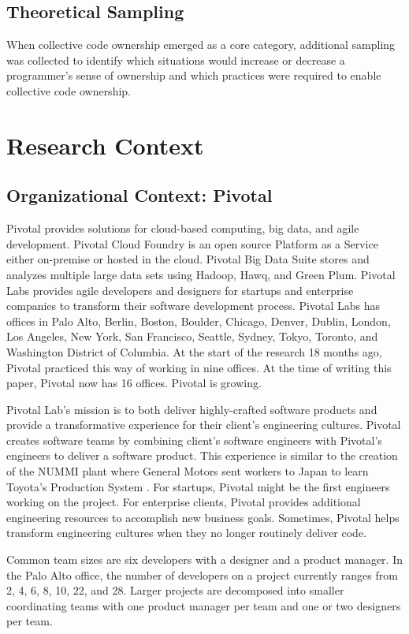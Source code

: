 \subsection{Theoretical Sampling}
When collective code ownership emerged as a core category, additional sampling was collected to identify which situations would increase or decrease a programmer's sense of ownership and which practices were required to enable collective code ownership.

\section{Research Context}
\label{ReseachContext}
\subsection{Organizational Context: Pivotal}
Pivotal provides solutions for cloud-based computing, big data, and agile development. Pivotal Cloud Foundry is an open source Platform as a Service either on-premise or hosted in the cloud. Pivotal Big Data Suite stores and analyzes multiple large data sets using Hadoop, Hawq, and Green Plum. Pivotal Labs provides agile developers and designers for startups and enterprise companies to transform their software development process. Pivotal Labs has offices in Palo Alto, Berlin, Boston, Boulder, Chicago, Denver, Dublin, London, Los Angeles, New York, San Francisco, Seattle, Sydney, Tokyo, Toronto, and Washington District of Columbia. At the start of the research 18 months ago, Pivotal practiced this way of working in nine offices. At the time of writing this paper, Pivotal now has 16 offices. Pivotal is growing.

Pivotal Lab's mission is to both deliver highly-crafted software products and provide a transformative experience for their client's engineering cultures. Pivotal creates software teams by combining client's software engineers with Pivotal's engineers to deliver a software product. This experience is similar to the creation of the NUMMI plant where General Motors sent workers to Japan to learn Toyota's Production System \cite{Nummi}. For startups, Pivotal might be the first engineers working on the project. For enterprise clients, Pivotal provides additional engineering resources to accomplish new business goals. Sometimes, Pivotal helps transform engineering cultures when they no longer routinely deliver code.  

Common team sizes are six developers with a designer and a product manager. In the Palo Alto office, the number of developers on a project currently ranges from 2, 4, 6, 8, 10, 22, and 28. Larger projects are decomposed into smaller coordinating teams with one product manager per team and one or two designers per team. 

